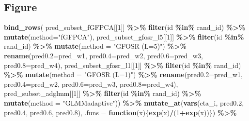 \documentclass[
]{article}
\newenvironment{Shaded}{\begin{snugshade}}{\end{snugshade}}
\newcommand{\AttributeTok}[1]{\textcolor[rgb]{0.13,0.29,0.53}{#1}}
\newcommand{\ControlFlowTok}[1]{\textcolor[rgb]{0.13,0.29,0.53}{\textbf{#1}}}
\newcommand{\DecValTok}[1]{\textcolor[rgb]{0.00,0.00,0.81}{#1}}
\newcommand{\FloatTok}[1]{\textcolor[rgb]{0.00,0.00,0.81}{#1}}
\newcommand{\FunctionTok}[1]{\textcolor[rgb]{0.13,0.29,0.53}{\textbf{#1}}}
\newcommand{\NormalTok}[1]{#1}
\newcommand{\SpecialCharTok}[1]{\textcolor[rgb]{0.81,0.36,0.00}{\textbf{#1}}}
\newcommand{\StringTok}[1]{\textcolor[rgb]{0.31,0.60,0.02}{#1}}
\begin{document}
\subsection{Figure}\label{figure}

\begin{Shaded}
\begin{Highlighting}[]
\FunctionTok{bind\_rows}\NormalTok{(}
\NormalTok{  pred\_subset\_fGFPCA[[}\DecValTok{1}\NormalTok{]] }\SpecialCharTok{\%\textgreater{}\%} \FunctionTok{filter}\NormalTok{(id }\SpecialCharTok{\%in\%}\NormalTok{ rand\_id) }\SpecialCharTok{\%\textgreater{}\%} \FunctionTok{mutate}\NormalTok{(}\AttributeTok{method=}\StringTok{"fGFPCA"}\NormalTok{),}
\NormalTok{  pred\_subset\_gfosr\_l5[[}\DecValTok{1}\NormalTok{]] }\SpecialCharTok{\%\textgreater{}\%} \FunctionTok{filter}\NormalTok{(id }\SpecialCharTok{\%in\%}\NormalTok{ rand\_id) }\SpecialCharTok{\%\textgreater{}\%} \FunctionTok{mutate}\NormalTok{(}\AttributeTok{method =} \StringTok{"GFOSR (L=5)"}\NormalTok{) }\SpecialCharTok{\%\textgreater{}\%} 
    \FunctionTok{rename}\NormalTok{(}\AttributeTok{pred0.2=}\NormalTok{pred\_w1, }\AttributeTok{pred0.4=}\NormalTok{pred\_w2, }\AttributeTok{pred0.6=}\NormalTok{pred\_w3, }\AttributeTok{pred0.8=}\NormalTok{pred\_w4),}
\NormalTok{  pred\_subset\_gfosr\_l1[[}\DecValTok{1}\NormalTok{]] }\SpecialCharTok{\%\textgreater{}\%} \FunctionTok{filter}\NormalTok{(id }\SpecialCharTok{\%in\%}\NormalTok{ rand\_id) }\SpecialCharTok{\%\textgreater{}\%} \FunctionTok{mutate}\NormalTok{(}\AttributeTok{method =} \StringTok{"GFOSR (L=1)"}\NormalTok{) }\SpecialCharTok{\%\textgreater{}\%}
    \FunctionTok{rename}\NormalTok{(}\AttributeTok{pred0.2=}\NormalTok{pred\_w1, }\AttributeTok{pred0.4=}\NormalTok{pred\_w2, }\AttributeTok{pred0.6=}\NormalTok{pred\_w3, }\AttributeTok{pred0.8=}\NormalTok{pred\_w4),}
\NormalTok{  pred\_subset\_adglmm[[}\DecValTok{1}\NormalTok{]] }\SpecialCharTok{\%\textgreater{}\%} \FunctionTok{filter}\NormalTok{(id }\SpecialCharTok{\%in\%}\NormalTok{ rand\_id) }\SpecialCharTok{\%\textgreater{}\%} \FunctionTok{mutate}\NormalTok{(}\AttributeTok{method =} \StringTok{"GLMMadaptive"}\NormalTok{)) }\SpecialCharTok{\%\textgreater{}\%}
  \FunctionTok{mutate\_at}\NormalTok{(}\FunctionTok{vars}\NormalTok{(eta\_i, pred0}\FloatTok{.2}\NormalTok{, pred0}\FloatTok{.4}\NormalTok{, pred0}\FloatTok{.6}\NormalTok{, pred0}\FloatTok{.8}\NormalTok{), }
                \AttributeTok{.funs =} \ControlFlowTok{function}\NormalTok{(x)\{}\FunctionTok{exp}\NormalTok{(x)}\SpecialCharTok{/}\NormalTok{(}\DecValTok{1}\SpecialCharTok{+}\FunctionTok{exp}\NormalTok{(x))\}) }\SpecialCharTok{\%\textgreater{}\%}

\end{Highlighting}
\end{Shaded}
\end{document}

